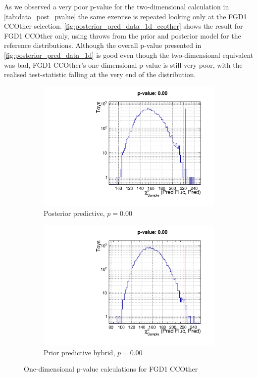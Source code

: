 As we observed a very poor p-value for the two-dimensional calculation in \autoref{tab:data_post_pvalue} the same exercise is repeated looking only at the FGD1 CCOther selection. \autoref{fig:posterior_pred_data_1d_ccother} shows the result for FGD1 CCOther only, using throws from the prior and posterior model for the reference distributions. Although the overall p-value presented in \autoref{fig:posterior_pred_data_1d} is good even though the two-dimensional equivalent was bad, FGD1 CCOther's one-dimensional p-value is still very poor, with the realised test-statistic falling at the very end of the distribution.
\begin{figure}[h]
	\begin{subfigure}[t]{0.49\textwidth}
		\includegraphics[width=\textwidth, trim={0mm 0mm 0mm 14mm}, clip,page=1]{figures/mach3/data/postpred/pvalue_posteriorpred_fgd1ccother_1d}
		\caption{Posterior predictive, $p=0.00$}
	\end{subfigure}
	\begin{subfigure}[t]{0.49\textwidth}
		\includegraphics[width=\textwidth, trim={0mm 0mm 0mm 14mm}, clip,page=1]{figures/mach3/data/postpred/prior_pred_fgd1ccother}
		\caption{Prior predictive hybrid, $p=0.00$}
	\end{subfigure}
	\caption{One-dimensional p-value calculations for FGD1 CCOther}
	\label{fig:posterior_pred_data_1d_ccother}
\end{figure}


